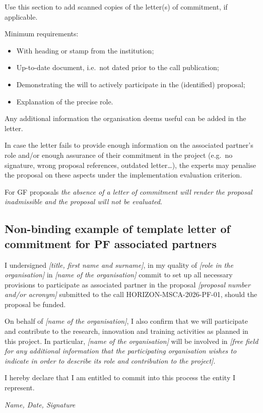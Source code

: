 \documentclass[12pt,draftproposal]{msca-pf}
\begin{document}
\begin{mscaexplanation}
Use this section to add scanned copies of the letter(s) of commitment, if applicable.

Minimum requirements:

\begin{itemize}
    \item With heading or stamp from the institution;
    \item Up-to-date document, i.e.\ not dated prior to the call publication;
    \item Demonstrating the will to actively participate in the (identified) proposal;
    \item Explanation of the precise role.
\end{itemize}

Any additional information the organisation deems useful can be added in the letter.

In case the letter fails to provide enough information on the associated partner's
role and/or enough assurance of their commitment in the project (e.g.\ no signature,
wrong proposal references, outdated letter…), the experts may penalise the
proposal on these aspects under the implementation evaluation criterion.

For GF proposals \emph{the absence of a letter of commitment will render the
proposal inadmissible and the proposal will not be evaluated}.
\end{mscaexplanation}

\subsection*{Non-binding example of template letter of commitment for PF associated partners}

I undersigned \emph{[title, first name and surname]}, in my quality of
\emph{[role in the organisation]} in \emph{[name of the organisation]} commit
to set up all necessary provisions to participate as associated partner in the
proposal \emph{[proposal number and/or acronym]} submitted to the call
HORIZON-MSCA-2026-PF-01, should the proposal be funded.

On behalf of \emph{[name of the organisation]}, I also confirm that we will
participate and contribute to the research, innovation and training activities
as planned in this project. In particular, \emph{[name of the organisation]}
will be involved in \emph{[free field for any additional information that the
participating organisation wishes to indicate in order to describe its role
and contribution to the project]}.

I hereby declare that I am entitled to commit into this process the entity I represent.

\hfill \emph{Name, Date, Signature}
\end{document}
